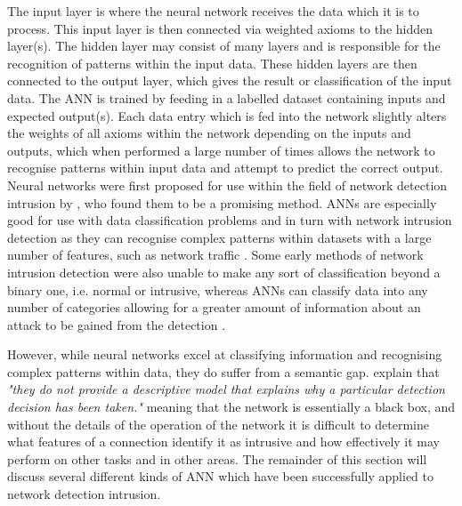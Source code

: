 	
	
	The input layer is where the neural network receives the data which it is to process. This input layer is then connected via weighted axioms to the hidden layer(s). The hidden layer may consist of many layers and is responsible for the recognition of patterns within the input data. These hidden layers are then connected to the output layer, which gives the result or classification of the input data.
	The ANN is trained by feeding in a labelled dataset containing inputs and expected output(s). Each data entry which is fed into the network slightly alters the weights of all axioms within the network depending on the inputs and outputs, which when performed a large number of times allows the network to recognise patterns within input data and attempt to predict the correct output.
	Neural networks were first proposed for use within the field of network detection intrusion by \cite{debar1992neural}, who found them to be a promising method. ANNs are especially good for use with data classification problems and in turn with network intrusion detection as they can recognise complex patterns within datasets with a large number of features, such as network traffic \cite{sung1998ranking}. Some early methods of network intrusion detection were also unable to make any sort of classification beyond a binary one, i.e. normal or intrusive, whereas ANNs can classify data into any number of categories allowing for a greater amount of information about an attack to be gained from the detection \cite{moradi2004neural}.
	
	However, while neural networks excel at classifying information and recognising complex patterns within data, they do suffer from a semantic gap. \cite{garcia2009anomaly} explain that \textit{"they do not provide a descriptive model that explains why a particular detection decision has been taken."} meaning that the network is essentially a black box, and without the details of the operation of the network it is difficult to determine what features of a connection identify it as intrusive and how effectively it may perform on other tasks and in other areas. The remainder of this section will discuss several different kinds of ANN which have been successfully applied to network detection intrusion.


